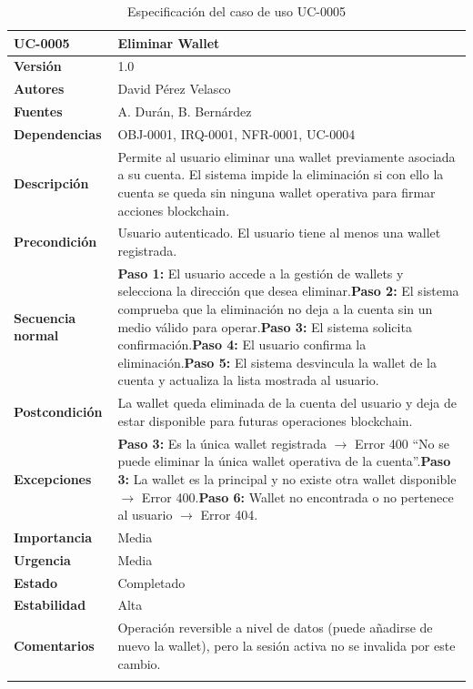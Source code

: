 \documentclass[11pt, a4paper]{article}
\begin{document}
\begin{longtable}{|p{4cm}|p{10cm}|}
\hline
\textbf{UC-0005} & Eliminar Wallet \\
\hline
\textbf{Versión} & 1.0 \\
\hline
\textbf{Autores} & David Pérez Velasco \\
\hline
\textbf{Fuentes} & A. Durán, B. Bernárdez \\
\hline
\textbf{Dependencias} & OBJ-0001, IRQ-0001, NFR-0001, UC-0004 \\
\hline
\textbf{Descripción} & Permite al usuario eliminar una wallet previamente asociada a su cuenta. El sistema impide la eliminación si con ello la cuenta se queda sin ninguna wallet operativa para firmar acciones blockchain. \\
\hline
\textbf{Precondición} & Usuario autenticado. El usuario tiene al menos una wallet registrada. \\
\hline
\textbf{Secuencia normal} & \textbf{Paso 1:} El usuario accede a la gestión de wallets y selecciona la dirección que desea eliminar.\newline\textbf{Paso 2:} El sistema comprueba que la eliminación no deja a la cuenta sin un medio válido para operar.\newline\textbf{Paso 3:} El sistema solicita confirmación.\newline\textbf{Paso 4:} El usuario confirma la eliminación.\newline\textbf{Paso 5:} El sistema desvincula la wallet de la cuenta y actualiza la lista mostrada al usuario. \\
\hline
\textbf{Postcondición} & La wallet queda eliminada de la cuenta del usuario y deja de estar disponible para futuras operaciones blockchain. \\
\hline
\textbf{Excepciones} & \textbf{Paso 3:} Es la única wallet registrada $\rightarrow$ Error 400 ``No se puede eliminar la única wallet operativa de la cuenta''.\newline\textbf{Paso 3:} La wallet es la principal y no existe otra wallet disponible $\rightarrow$ Error 400.\newline\textbf{Paso 6:} Wallet no encontrada o no pertenece al usuario $\rightarrow$ Error 404. \\
\hline
\textbf{Importancia} & Media \\
\hline
\textbf{Urgencia} & Media \\
\hline
\textbf{Estado} & Completado \\
\hline
\textbf{Estabilidad} & Alta \\
\hline
\textbf{Comentarios} & Operación reversible a nivel de datos (puede añadirse de nuevo la wallet), pero la sesión activa no se invalida por este cambio. \\
\hline
\caption{Especificación del caso de uso UC-0005}
\end{longtable}
\end{document}
